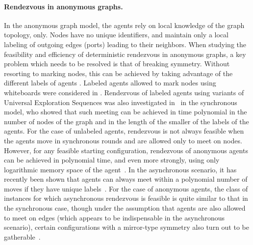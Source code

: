 \documentclass{llncs}
\begin{document}
\paragraph{Rendezvous in anonymous graphs.}

In the anonymous graph model, the agents rely on local knowledge of the graph topology, only. Nodes have no unique identifiers, and maintain only a local labeling of outgoing edges (ports) leading to their neighbors. When studying the feasibility and efficiency of deterministic rendezvous in anonymous graphs, a key problem which needs to be resolved is that of breaking symmetry. Without resorting to marking nodes, this can be achieved by taking advantage of the different labels of agents  \cite{DGKKP,DessmarkFKP06,KM}.  Labeled agents allowed to mark nodes using whiteboards were considered in \cite{YuY96}. Rendezvous of labeled agents using variants of Universal Exploration Sequences was also investigated in~\cite{TSZ07,KM} in the synchronous model, who showed that such meeting can be achieved in time polynomial in the number of nodes of the graph and in the length of the smaller of the labels of the agents. For the case of unlabeled agents, rendezvous is not always feasible when the agents move in synchronous rounds and are allowed only to meet on nodes. However, for any feasible starting configuration, rendezvous of anonymous agents can be achieved in polynomial time, and even more strongly, using only logarithmic memory space of the agent~\cite{CKP12}. In the asynchronous scenario, it has recently been shown that agents can always meet within a polynomial number of moves if they have unique labels~\cite{DPV}. For the case of anonymous agents, the class of instances for which asynchronous rendezvous is feasible is quite similar to that in the synchronous case, though under the assumption that agents are also allowed to meet on edges (which appears to be indispensable in the asynchronous scenario), certain configurations with a mirror-type symmetry also turn out to be gatherable~\cite{GP11}.
\end{document}
